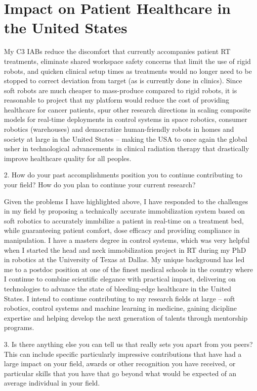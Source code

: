 \documentclass[12pt,a4paper]{article}
\begin{document}
\section{Impact on Patient Healthcare in the United States}
My C3 IABs reduce the discomfort that currently accompanies patient RT treatments, eliminate shared workspace safety concerns that limit the use of rigid robots, and quicken clinical setup times as treatments would no longer need to be stopped to correct deviation from target (as is currently done in clinics). Since soft robots are much cheaper to mass-produce compared to rigid robots, it is reasonable to project that my platform would reduce the cost of providing healthcare for cancer patients, spur other research directions in scaling composite models for real-time deployments in control systems in space robotics, consumer robotics (warehouses) and democratize human-friendly robots in homes and society at large in the United States -- making the USA to once again the global usher in technological advancements in clinical radiation therapy that drastically improve healthcare quality for all peoples.



2.  How do your past accomplishments position you to continue contributing to your field? How do you plan to continue your current research?

Given the problems I have highlighted above, I have responded to the challenges in my field by proposing a technically accurate immobilization system based on soft robotics to accurately immbilize a patient in real-time on a treatment bed, while guaranteeing patient comfort, dose efficacy and providing compliance in manipulation. I have a masters degree in control systems, which was very helpful when I started the head and neck immobilization project in RT during my PhD in robotics at the University of Texas at Dallas. My unique background has led me to a postdoc position at one of the finest medical schools in the country where I continue to combine scientific elegance with practical impact, delivering on technologies to advance the state of bleeding-edge healthcare in the United States. I intend to continue contributing to my research fields at large -- soft robotics, control systems and machine learning in medicine, gaining dicipline expertise and helping develop the next generation of talents through mentorship programs.




3.  Is there anything else you can tell us that really sets you apart from you peers? This can include specific particularly impressive contributions that have had a large impact on your field, awards or other recognition you have received, or particular skills that you have that go beyond what would be expected of an average individual in your field. 
\end{document}
